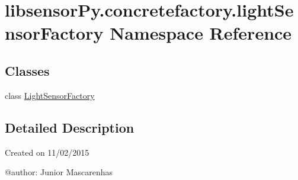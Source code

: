 \hypertarget{namespacelibsensorPy_1_1concretefactory_1_1lightSensorFactory}{}\section{libsensor\+Py.\+concretefactory.\+light\+Sensor\+Factory Namespace Reference}
\label{namespacelibsensorPy_1_1concretefactory_1_1lightSensorFactory}
\subsection*{Classes}
\begin{DoxyCompactItemize}
\item 
class \hyperlink{classlibsensorPy_1_1concretefactory_1_1lightSensorFactory_1_1LightSensorFactory}{Light\+Sensor\+Factory}
\end{DoxyCompactItemize}


\subsection{Detailed Description}
\begin{DoxyVerb}Created on 11/02/2015

@author: Junior Mascarenhas
\end{DoxyVerb}
 